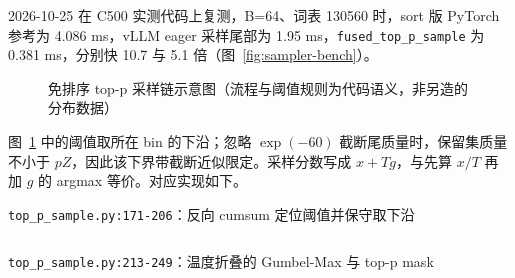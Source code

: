 \documentclass[11pt,a4paper]{ctexart}
\newcommand{\GemsCode}{../pkg_build/XLANG2026/FlagGems}%
\newcommand{\GemsCode}{../../XLANG2026/FlagGems}%
\begin{document}
2026-10-25 在 C500 实测代码上复测，B=64、词表 130560 时，sort 版 PyTorch 参考为 4.086 ms，vLLM eager 采样尾部为 1.95 ms，\texttt{fused\_top\_p\_sample} 为 0.381 ms，分别快 10.7 与 5.1 倍（图~\ref{fig:sampler-bench}）。

\begin{figure}[!htbp]
\centering
{}
\caption{免排序 top-p 采样链示意图（流程与阈值规则为代码语义，非另造的分布数据）\label{fig:topp}}
\end{figure}

图~\ref{fig:topp} 中的阈值取所在 bin 的下沿；忽略 $\exp(-60)$ 截断尾质量时，保留集质量不小于 $pZ$，因此该下界带截断近似限定。采样分数写成 $x+Tg$，与先算 $x/T$ 再加 $g$ 的 argmax 等价。对应实现如下。

\begin{reportcode}{\texttt{top\_p\_sample.py:171-206}：反向 cumsum 定位阈值并保守取下沿}
\inputminted[linenos,fontsize=\scriptsize,breaklines,tabsize=4,firstline=171,lastline=206]{python}{\GemsCode/src/flag_gems/fused/top_p_sample.py}
\end{reportcode}

\begin{reportcode}{\texttt{top\_p\_sample.py:213-249}：温度折叠的 Gumbel-Max 与 top-p mask}
\inputminted[linenos,fontsize=\scriptsize,breaklines,tabsize=4,firstline=213,lastline=249]{python}{\GemsCode/src/flag_gems/fused/top_p_sample.py}
\end{reportcode}
\end{document}
